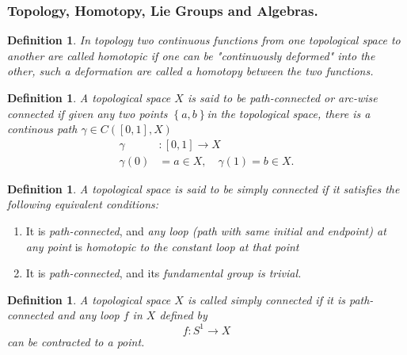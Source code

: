 \documentclass[aps,preprint]{revtex4}%
\newtheorem{definition}[theorem]{Definition}
\begin{document}
\subsubsection{Topology, Homotopy, Lie Groups and Algebras.}

\begin{definition}
In \emph{topology} two \emph{continuous functions} from one topological space
to another are called \emph{homotopic} if one can be "continuously deformed"
into the other, such a deformation are called a \emph{homotopy} between the
two functions.
\end{definition}

\begin{definition}
A topological space $X$ is said to be \emph{path-connected or arc-wise
connected} if given any two points $\left\{  a,b\right\}  $in the topological
space, there is a \emph{continous path} $\gamma\in C\left(  \left[
0,1\right]  ,X\right)  $
\begin{align}
\gamma &  :\left[  0,1\right]  \rightarrow X\\
\gamma\left(  0\right)   &  =a\in X,\quad\gamma\left(  1\right)  =b\in X.
\end{align}

\end{definition}

\begin{definition}
A topological space is said to be \emph{simply connected} if it satisfies the
following equivalent conditions:
\end{definition}

\begin{enumerate}
\item It is \emph{path-connected}, and \emph{any loop (path with same initial
and endpoint) at any point} is \emph{homotopic to the constant loop at that
point}

\item It is \emph{path-connected}, and its \emph{fundamental group is
trivial.}
\end{enumerate}

\begin{definition}
A topological space $X$ is called \emph{simply connected} if it is
\emph{path-connected} and any \emph{loop} $f$ in $X$ defined by
\begin{equation}
f:S^{1}\rightarrow X
\end{equation}
can be contracted to a point.
\end{definition}
\end{document}
